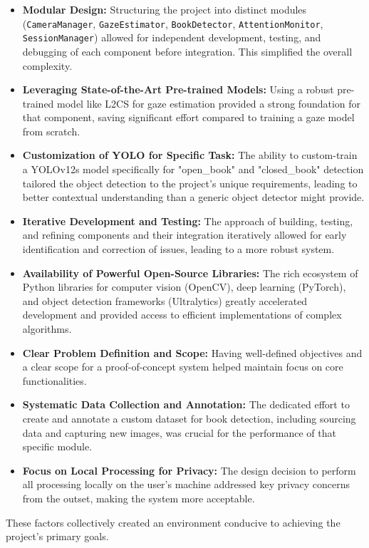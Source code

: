 \begin{itemize}
    \item \textbf{Modular Design:} Structuring the project into distinct modules (\texttt{CameraManager}, \texttt{GazeEstimator}, \texttt{BookDetector}, \texttt{AttentionMonitor}, \texttt{SessionManager}) allowed for independent development, testing, and debugging of each component before integration. This simplified the overall complexity.
    \item \textbf{Leveraging State-of-the-Art Pre-trained Models:} Using a robust pre-trained model like L2CS for gaze estimation provided a strong foundation for that component, saving significant effort compared to training a gaze model from scratch.
    \item \textbf{Customization of YOLO for Specific Task:} The ability to custom-train a YOLOv12s model specifically for "open\_book" and "closed\_book" detection tailored the object detection to the project's unique requirements, leading to better contextual understanding than a generic object detector might provide.
    \item \textbf{Iterative Development and Testing:} The approach of building, testing, and refining components and their integration iteratively allowed for early identification and correction of issues, leading to a more robust system.
    \item \textbf{Availability of Powerful Open-Source Libraries:} The rich ecosystem of Python libraries for computer vision (OpenCV), deep learning (PyTorch), and object detection frameworks (Ultralytics) greatly accelerated development and provided access to efficient implementations of complex algorithms.
    \item \textbf{Clear Problem Definition and Scope:} Having well-defined objectives and a clear scope for a proof-of-concept system helped maintain focus on core functionalities.
    \item \textbf{Systematic Data Collection and Annotation:} The dedicated effort to create and annotate a custom dataset for book detection, including sourcing data and capturing new images, was crucial for the performance of that specific module.
    \item \textbf{Focus on Local Processing for Privacy:} The design decision to perform all processing locally on the user's machine addressed key privacy concerns from the outset, making the system more acceptable.
\end{itemize}
These factors collectively created an environment conducive to achieving the project's primary goals.

